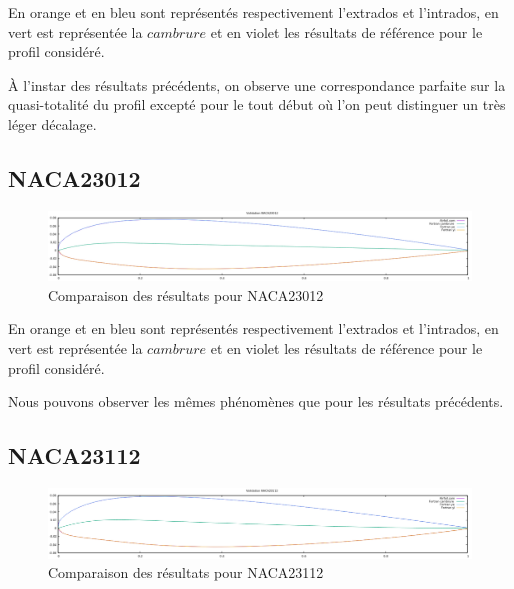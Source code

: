 \documentclass[a4paper,oneside]{article}
\makeatletter
\def\bigcenter{\trivlist \bigcentering\item\relax}
\def\bigcentering{\let\\\@centercr\rightskip\@bigflushglue%
\leftskip\@bigflushglue
\parindent\z@\parfillskip\z@skip}
\makeatother
\begin{document}
En orange et en bleu sont représentés respectivement l'extrados et l'intrados, en vert est représentée la $cambrure$ et en violet les résultats de référence pour le profil considéré.

\`A l'instar des résultats précédents, on observe une correspondance parfaite sur la quasi-totalité du profil excepté pour le tout début où l'on peut distinguer un très léger décalage.
\newpage
\subsection{NACA23012}

\begin{figure}[h!]
\bigcenter
\includegraphics[scale=0.4]{Validation23012}
\caption{Comparaison des résultats pour NACA23012}
\end{figure}

En orange et en bleu sont représentés respectivement l'extrados et l'intrados, en vert est représentée la $cambrure$ et en violet les résultats de référence pour le profil considéré.

Nous pouvons observer les mêmes phénomènes que pour les résultats précédents.

\subsection{NACA23112}


\begin{figure}[h!]
\bigcenter
\includegraphics[scale=0.4]{Validation23112.png}
\caption{Comparaison des résultats pour NACA23112}
\end{figure}



  
\end{document}
